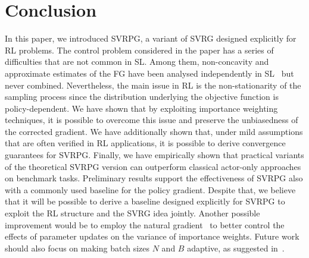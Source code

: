 \documentclass{article}
\makeatletter
\theoremstyle{remark}
\theoremstyle{definition}
\DeclareRobustCommand{\eg}{e.g.,\@\xspace}
\newcommand{\todomatout}[1]{\todo[color=citrine]{\scriptsize #1}}
\makeatother
\begin{document}
\section{Conclusion}
\vspace{-0.05in}
In this paper, we introduced SVRPG, a variant of SVRG designed explicitly for RL problems.
The control problem considered in the paper has a series of difficulties that are not common in SL.
Among them, non-concavity and approximate estimates of the FG have been analysed independently in SL~\citep[\eg][]{allen2016variance,reddi2016stochastic,harikandeh2015stopwasting} but never combined.
Nevertheless, the main issue in RL is the non-stationarity of the sampling process since the distribution underlying the objective function is policy-dependent.
We have shown that by exploiting importance weighting techniques, it is possible to overcome this issue and preserve the unbiasedness of the corrected gradient.
We have additionally shown that, under mild assumptions that are often verified in RL applications, it is possible to derive convergence guarantees for SVRPG.
Finally, we have empirically shown that practical variants of the theoretical SVRPG version can outperform classical actor-only approaches on benchmark tasks.
Preliminary results support the effectiveness of SVRPG also with a commonly used baseline for the policy gradient.
Despite that, we believe that it will be possible to derive a baseline designed explicitly for SVRPG to exploit the RL structure and the SVRG idea jointly.
Another possible improvement would be to employ the natural gradient~\cite{kakade2002natural} to better control the effects of parameter updates on the variance of importance weights. Future work should also focus on making batch sizes $N$ and $B$ adaptive, as suggested in~\cite{papini2017adaptive}.

\FloatBarrier



\clearpage
\onecolumn
\appendix
\end{document}

